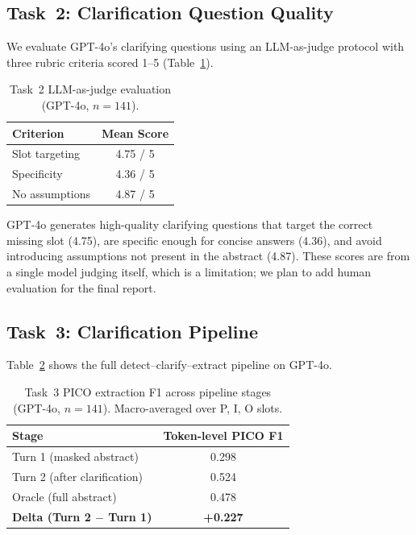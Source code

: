 \documentclass[11pt]{article}
\begin{document}
\subsection{Task~2: Clarification Question Quality}

We evaluate GPT-4o's clarifying questions using an LLM-as-judge protocol with three rubric criteria scored 1--5 (Table~\ref{tab:task2}).

\begin{table}[h]
\centering
\small
\begin{tabular}{lc}
\toprule
\textbf{Criterion} & \textbf{Mean Score} \\
\midrule
Slot targeting    & 4.75 / 5 \\
Specificity       & 4.36 / 5 \\
No assumptions    & 4.87 / 5 \\
\bottomrule
\end{tabular}
\caption{Task~2 LLM-as-judge evaluation (GPT-4o, $n = 141$).}
\label{tab:task2}
\end{table}

GPT-4o generates high-quality clarifying questions that target the correct missing slot (4.75), are specific enough for concise answers (4.36), and avoid introducing assumptions not present in the abstract (4.87).
These scores are from a single model judging itself, which is a limitation; we plan to add human evaluation for the final report.

\subsection{Task~3: Clarification Pipeline}

Table~\ref{tab:task3} shows the full detect--clarify--extract pipeline on GPT-4o.

\begin{table}[h]
\centering
\small
\begin{tabular}{lc}
\toprule
\textbf{Stage} & \textbf{Token-level PICO F1} \\
\midrule
Turn 1 (masked abstract)         & 0.298 \\
Turn 2 (after clarification)     & 0.524 \\
Oracle (full abstract)           & 0.478 \\
\midrule
\textbf{Delta (Turn 2 $-$ Turn 1)} & \textbf{+0.227} \\
\bottomrule
\end{tabular}
\caption{Task~3 PICO extraction F1 across pipeline stages (GPT-4o, $n = 141$). Macro-averaged over P, I, O slots.}
\label{tab:task3}
\end{table}
\end{document}
